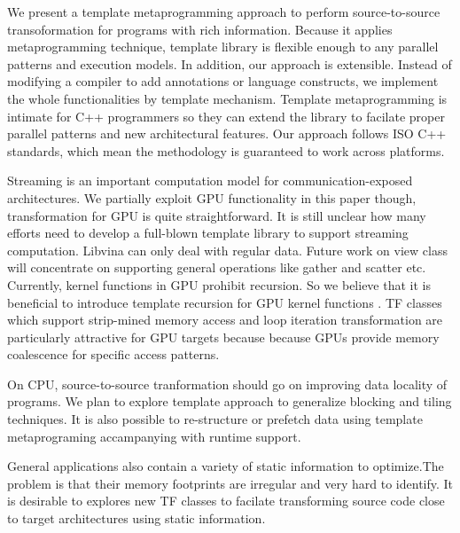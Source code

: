 \documentclass[10pt, conference, compsocconf]{IEEEtran}
\begin{document}
We present a template metaprogramming approach to perform source-to-source
transoformation for programs with rich information. Because it applies 
metaprogramming technique, template library is flexible enough to any parallel
patterns and execution models. In addition, our approach
is extensible. Instead of modifying a compiler to add
annotations or language constructs, we implement the whole
functionalities by template mechanism. Template metaprogramming is
intimate for C++ programmers so they can extend the library to
facilate proper parallel patterns and new architectural
features.  Our approach follows ISO C++ standards, which mean the
methodology is guaranteed to work across platforms.  


Streaming is an important computation model for communication-exposed
architectures. We partially exploit  GPU functionality in this
paper though, transformation for GPU is quite
straightforward.  It is still unclear how many efforts need to
develop a full-blown template library to support
streaming computation.  Libvina can only deal with regular
data. Future work on view class  will concentrate on supporting general operations like gather and scatter etc.  
Currently, kernel functions in GPU prohibit recursion. So we believe that
it is beneficial to introduce template recursion for GPU kernel functions . TF classes which support strip-mined memory access and loop iteration transformation are
particularly attractive for GPU targets because because  GPUs
provide memory coalescence for specific access patterns.

On CPU, source-to-source tranformation should go on improving data
locality of programs. We plan to explore template approach to  generalize
blocking and tiling techniques.  It is also possible to re-structure
or prefetch data using template metaprograming accampanying with runtime support.

General applications also contain a variety of static information to
optimize.The problem is that their memory footprints are irregular and
very hard to identify. It is desirable to explores new TF classes to facilate
transforming source code close to target architectures using static
information.
\end{document}
